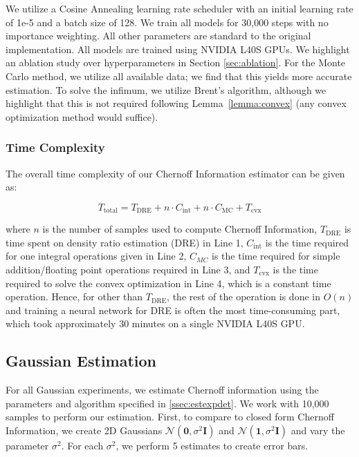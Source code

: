 \documentclass[11pt,letterpaper]{article}
\begin{document}
We utilize a Cosine Annealing learning rate scheduler with an initial learning rate of 1e-5 and a batch size of 128. We train all models for 30,000 steps with no importance weighting. All other parameters are standard to the original implementation. All models are trained using NVIDIA L40S GPUs. We highlight an ablation study over hyperparameters in Section \ref{sec:ablation}. For the Monte Carlo method, we utilize all available data; we find that this yields more accurate estimation. To solve the infimum, we utilize Brent's algorithm, although we highlight that this is not required following Lemma~\ref{lemma:convex} (any convex optimization method would suffice).

\subsubsection{Time Complexity}

The overall time complexity of our Chernoff Information estimator can be given as:

\begin{equation}
T_\text{total} = T_\text{DRE} + n \cdot  C_\text{int} + n \cdot C_\text{MC} + T_\text{cvx}
\end{equation}

where $n$ is the number of samples used to compute Chernoff Information, $T_\text{DRE}$ is time spent on density ratio estimation (DRE) in Line 1, $C_\text{int}$ is the time required for one integral operations given in Line 2,  $C_{MC}$ is the time required for simple addition/floating point operations required in Line 3, and $T_\text{cvx}$ is the time required to solve the convex optimization in Line 4, which is a constant time operation. Hence, for other than $T_\text{DRE}$, the rest of the operation is done in $O(n)$ and training a neural network for DRE is often the most time-consuming part, which took approximately 30 minutes on a single NVIDIA L40S GPU.

\subsection{Gaussian Estimation} \label{ssec:gaussexpdet}


For all Gaussian experiments, we estimate Chernoff information using the parameters and algorithm specified in \ref{ssec:estexpdet}. We work with 10,000 samples to perform our estimation. First, to compare to closed form Chernoff Information, we create 2D Gaussians $\mathcal{N}(\textbf{0},  \sigma^2\mathbf{I})$ and $\mathcal{N}(\textbf{1},  \sigma^2\mathbf{I})$ and vary the parameter $\sigma^2$. For each $\sigma^2$, we perform 5 estimates to create error bars.
\end{document}
